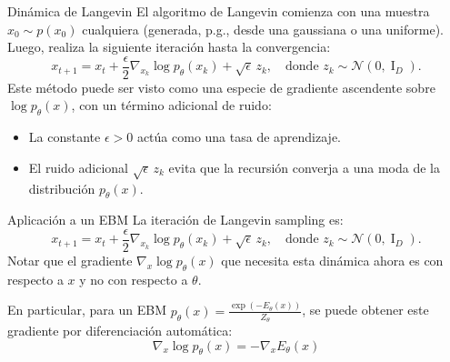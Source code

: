 \documentclass{beamer}
\begin{document}
\begin{frame}{Dinámica de Langevin}
    El algoritmo de Langevin comienza con una muestra $x_0\sim p(x_0)$ cualquiera (generada, p.g., desde una gaussiana o una uniforme). Luego, realiza la siguiente iteración hasta la convergencia:
    \begin{equation*}
        x_{t+1} = x_t+\frac{\epsilon}{2} \nabla_{x_k} \log p_\theta(x_k)+\sqrt{\epsilon}\, z_k,
        \quad\text{donde }
        z_k\sim\mathcal{N}(0,\operatorname{I}_D).
    \end{equation*}
    Este método puede ser visto como una especie de gradiente ascendente sobre $\log p_\theta(x)$, con un término adicional de ruido:
    \begin{itemize}
        \item La constante $\epsilon>0$ actúa como una tasa de aprendizaje.
        \item El ruido adicional $\sqrt{\epsilon}\, z_k$ evita que la recursión converja a una moda de la distribución $p_\theta(x)$.
    \end{itemize}
\end{frame}

\begin{frame}{Aplicación a un EBM}
    La iteración de Langevin sampling es:
    \begin{equation*}
        x_{t+1} = x_t+\frac{\epsilon}{2} \nabla_{x_k} \log p_\theta(x_k)+\sqrt{\epsilon}\, z_k,
        \quad\text{donde }
        z_k\sim\mathcal{N}(0,\operatorname{I}_D).
    \end{equation*}
    Notar que el gradiente $\nabla_{x} \log p_\theta(x)$ que necesita esta dinámica ahora es con respecto a $x$ y no con respecto a $\theta$.

    En particular, para un EBM $p_\theta(x)=\frac{\exp\left(-E_\theta(x)\right)}{Z_\theta}$, se puede obtener este gradiente por diferenciación automática:
    \begin{equation*}
        \nabla_x\log p_\theta(x) =-\nabla_xE_\theta(x)
    \end{equation*}
\end{frame}
\end{document}

